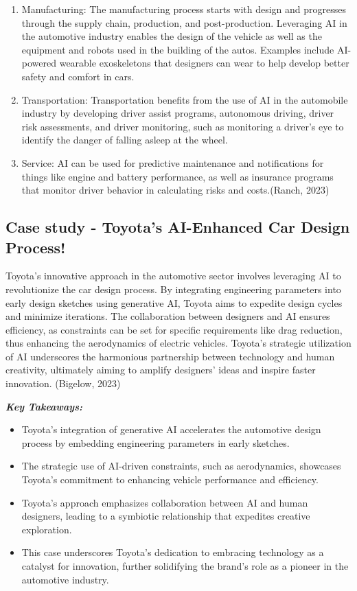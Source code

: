 \documentclass[
]{article}
\begin{document}
\begin{enumerate}
\def\labelenumi{\arabic{enumi}.}
\item
  Manufacturing: The manufacturing process starts with design and progresses through the supply chain, production, and post-production. Leveraging AI in the automotive industry enables the design of the vehicle as well as the equipment and robots used in the building of the autos. Examples include AI-powered wearable exoskeletons that designers can wear to help develop better safety and comfort in cars.
\item
  Transportation: Transportation benefits from the use of AI in the automobile industry by developing driver assist programs, autonomous driving, driver risk assessments, and driver monitoring, such as monitoring a driver's eye to identify the danger of falling asleep at the wheel.
\item
  Service: AI can be used for predictive maintenance and notifications for things like engine and battery performance, as well as insurance programs that monitor driver behavior in calculating risks and costs.(Ranch, 2023)
\end{enumerate}

\hypertarget{case-study---toyotas-ai-enhanced-car-design-process}{%
\subsection{Case study - Toyota's AI-Enhanced Car Design Process!}\label{case-study---toyotas-ai-enhanced-car-design-process}}

Toyota's innovative approach in the automotive sector involves leveraging AI to revolutionize the car design process. By integrating engineering parameters into early design sketches using generative AI, Toyota aims to expedite design cycles and minimize iterations. The collaboration between designers and AI ensures efficiency, as constraints can be set for specific requirements like drag reduction, thus enhancing the aerodynamics of electric vehicles. Toyota's strategic utilization of AI underscores the harmonious partnership between technology and human creativity, ultimately aiming to amplify designers' ideas and inspire faster innovation. (Bigelow, 2023)

\textbf{\emph{\emph{\textbf{Key Takeaways:}}}}

\begin{itemize}
\item
  Toyota's integration of generative AI accelerates the automotive design process by embedding engineering parameters in early sketches.
\item
  The strategic use of AI-driven constraints, such as aerodynamics, showcases Toyota's commitment to enhancing vehicle performance and efficiency.
\item
  Toyota's approach emphasizes collaboration between AI and human designers, leading to a symbiotic relationship that expedites creative exploration.
\item
  This case underscores Toyota's dedication to embracing technology as a catalyst for innovation, further solidifying the brand's role as a pioneer in the automotive industry.
\end{itemize}
\end{document}
